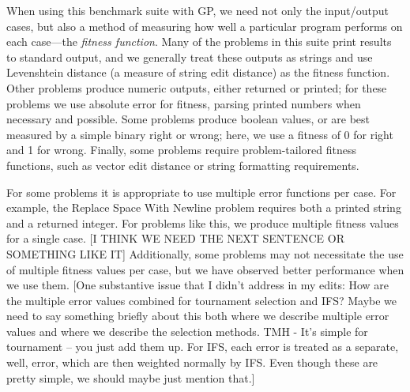\documentclass{sig-alternate}
\begin{document}
When using this benchmark suite with GP, we need not only the input/output cases, but also a method of measuring how well a particular program performs on each case---the \textit{fitness function}. 
Many of the problems in this suite print results to standard output, and we generally treat these outputs as strings and use Levenshtein distance (a measure of string edit distance) as the fitness function. Other problems produce numeric outputs, either returned or printed; for these problems we use absolute error for fitness, parsing printed numbers when necessary and possible. Some problems produce boolean values, or are best measured by a simple binary right or wrong; here, we use a fitness of 0 for right and 1 for wrong. Finally, some problems require problem-tailored fitness functions, such as vector edit distance or string formatting requirements.

For some problems it is appropriate to use multiple error functions per case. For example, the Replace Space With Newline problem requires both a printed string and a returned integer. For problems like this, we produce multiple fitness values for a single case. 
[I THINK WE NEED THE NEXT SENTENCE OR SOMETHING LIKE IT] Additionally, some problems may not necessitate the use of multiple fitness values per case, but we have observed better performance when we use them. [One substantive issue that I didn't address in my edits: How are the multiple error values combined for tournament selection and IFS? Maybe we need to say something briefly about this both where we describe multiple error values and where we describe the selection methods. TMH - It's simple for tournament -- you just add them up. For IFS, each error is treated as a separate, well, error, which are then weighted normally by IFS. Even though these are pretty simple, we should maybe just mention that.]
\end{document}

